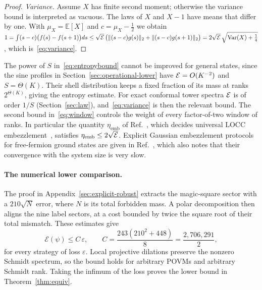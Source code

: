 \begin{proof}
\emph{Variance.} Assume $X$ has finite second moment; otherwise the variance bound is interpreted as vacuous. The laws of $X$ and $X-1$ have means that differ by one. With
$\mu_X=\mathbb{E}[X]$ and $c=\mu_X-\tfrac12$ we obtain
$1=\int(s-c)\bigl(f(s)-f(s+1)\bigr)ds\le\sqrt{\mathcal{E}}\,\bigl(\lVert (s-c)g(s)\rVert_2+\lVert (s-c)g(s+1)\rVert_2\bigr)
=2\sqrt{\mathcal{E}}\,\sqrt{\operatorname{Var}(X)+\tfrac14}$, which is~\eqref{eq:variance}.
\end{proof}

\begin{remark}\label{rem:sharp}
The power of $S$ in~\eqref{eq:entropybound} cannot be improved for general states, since the sine profiles in Section~\ref{sec:operational-lower} have
$\mathcal{E}=O(K^{-2})$ and $S=\Theta(K)$. Their shell distribution keeps a fixed
fraction of its mass at ranks $2^{\Theta(K)}$, giving the entropy estimate. For exact conformal tower spectra $\mathcal{E}$
is of order $1/S$ (Section~\ref{sec:law}), and~\eqref{eq:variance} is then the relevant bound.
The second bound in~\eqref{eq:window} controls the weight of every factor-of-two window of
ranks. In particular the quantity $\eta_{\mathrm{emb}}$ of Ref.~\cite{Sierant26}, which decides
universal LOCC embezzlement~\cite{ZTG24}, satisfies $\eta_{\mathrm{emb}}\le2\sqrt{\mathcal{E}}$. Explicit
Gaussian embezzlement protocols for free-fermion ground states are given in
Ref.~\cite{KvLSW25}, which also notes that their convergence with the system size is very slow.
\end{remark}


\paragraph{The numerical lower comparison.}
The proof in Appendix~\ref{sec:explicit-robust} extracts the magic-square
sector with a $210\sqrt N$ error, where $N$ is its total forbidden mass.
A polar decomposition then aligns the nine label sectors, at a cost bounded
by twice the square root of their total mismatch. These estimates give
\[
 \mathcal E(\psi)\le C\,\varepsilon,\qquad
 C=\frac{243(210^2+448)}8=\frac{2{,}706{,}291}{2},
\]
for every strategy of loss $\varepsilon$. Local projective dilations preserve
the nonzero Schmidt spectrum, so the bound holds for arbitrary POVMs and
arbitrary Schmidt rank. Taking the infimum of the loss proves the lower
bound in Theorem~\ref{thm:equiv}.
